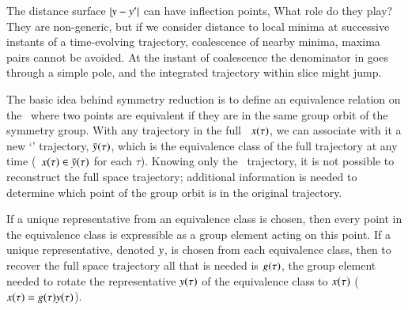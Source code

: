 The distance surface $|y - {y'}|$ can have inflection points,
What role do they play? They are non-generic, but if we consider distance
to local minima at successive instants of a time-evolving trajectory,
coalescence of
nearby minima, maxima pairs cannot be avoided. At the instant of
coalescence the denominator in  goes through a simple
pole, and the integrated trajectory within slice might jump.






The basic idea behind symmetry reduction is to define an equivalence
relation on the \statesp\ where two points are equivalent if they are in
the same group orbit of the symmetry group. With any trajectory in the
full \statesp\, $x(\tau)$, we can associate with it a new `\reducedsp'
trajectory, $\bar{y}(\tau)$, which is the equivalence class of the
full trajectory at any time (\ie\ $x(\tau) \in \bar{y}(\tau)$
for each $\tau$).
Knowing only the \reducedsp\ trajectory, it is not
possible to reconstruct the full space trajectory; additional information
is needed to determine which point of the group orbit is in the original
trajectory.

If a unique representative from an equivalence class is chosen, then
every point in the equivalence class is expressible as a group element
acting on this point. If a unique representative, denoted $y$, is
chosen from each equivalence class, then to recover the full space
trajectory all that is needed is $g(\tau)$, the group element needed
to rotate the representative $y(\tau)$ of the equivalence class to
$x(\tau)$ (\ie\ $x(\tau)=g(\tau) y(\tau)$).





